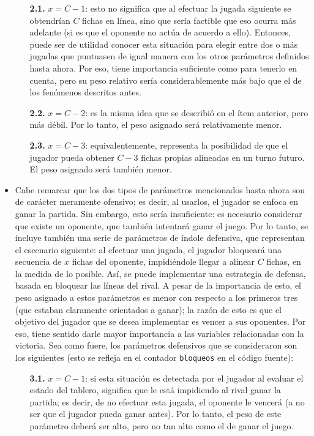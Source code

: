 \documentclass[12pt,a4paper]{article}
\begin{document}
\begin{itemize}
            \begin{itemize}
                \item[\textbf{2.1.}] $x = C-1$: esto no significa que al efectuar la jugada siguiente se obtendrían $C$ fichas en línea, sino que sería factible que eso ocurra más adelante (si es que el oponente no actúa de acuerdo a ello). Entonces, puede ser de utilidad conocer esta situación para elegir entre dos o más jugadas que puntuasen de igual manera con los otros parámetros definidos hasta ahora. Por eso, tiene importancia suficiente como para tenerlo en cuenta, pero su peso relativo sería considerablemente más bajo que el de los fenómenos descritos antes.
                \item[\textbf{2.2.}] $x = C-2$: es la misma idea que se describió en el ítem anterior, pero más débil. Por lo tanto, el peso asignado será relativamente menor.
                \item[\textbf{2.3.}] $x = C-3$: equivalentemente, representa la posibilidad de que el jugador pueda obtener $C-3$ fichas propias alineadas en un turno futuro. El peso asignado será también menor.
            \end{itemize}
        \item Cabe remarcar que los dos tipos de parámetros mencionados hasta ahora son de carácter meramente ofensivo; es decir, al usarlos, el jugador se enfoca en ganar la partida. Sin embargo, esto sería insuficiente: es necesario considerar que existe un oponente, que también intentará ganar el juego. Por lo tanto, se incluye también una serie de parámetros de índole defensiva, que representan el escenario siguiente: al efectuar una jugada, el jugador bloqueará una secuencia de $x$ fichas del oponente, impidiéndole llegar a alinear $C$ fichas, en la medida de lo posible. Así, se puede implementar una estrategia de defensa, basada en bloquear las líneas del rival. A pesar de la importancia de esto, el peso asignado a estos parámetros es menor con respecto a los primeros tres (que estaban claramente orientados a ganar); la razón de esto es que el objetivo del jugador que se desea implementar es vencer a sus oponentes. Por eso, tiene sentido darle mayor importancia a las variables relacionadas con la victoria. Sea como fuere, los parámetros defensivos que se consideraron son los siguientes (esto se refleja en el contador \texttt{bloqueos} en el código fuente):
            \begin{itemize}
                \item[\textbf{3.1.}] $x = C-1$: si esta situación es detectada por el jugador al evaluar el estado del tablero, significa que le está impidiendo al rival ganar la partida; es decir, de no efectuar esta jugada, el oponente le vencerá (a no ser que el jugador pueda ganar antes). Por lo tanto, el peso de este parámetro deberá ser alto, pero no tan alto como el de ganar el juego.

\end{itemize}
\end{itemize}
\end{document}
